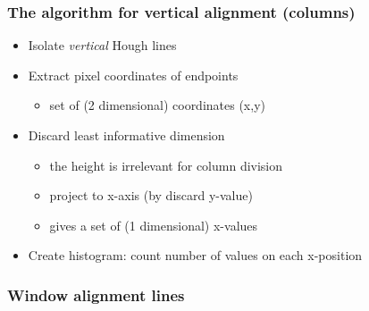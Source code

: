 \documentclass{beamer}
\begin{document}
\frame
{
	\frametitle{The algorithm for vertical alignment (columns)}
	\begin{itemize}
	\item <+-| alert@+> Isolate \emph{vertical} Hough lines
	\item <+-| alert@+> Extract pixel coordinates of endpoints 
		\begin{itemize}
		\item <+-| alert@+> set of (2 dimensional) coordinates (x,y)
		\end{itemize}
	\item <+-| alert@+> Discard least informative dimension
		\begin{itemize}
		\item <+-| alert@+> the height is irrelevant for column division
		\item <+-| alert@+> project to x-axis (by discard y-value) 
		\item <+-| alert@+> gives a set of (1 dimensional) x-values 
		\end{itemize}
	\item <+-| alert@+> Create histogram: count number of values on each x-position
	\end{itemize}
}

\frame
{
	\frametitle{Window alignment lines}
}
\end{document}
